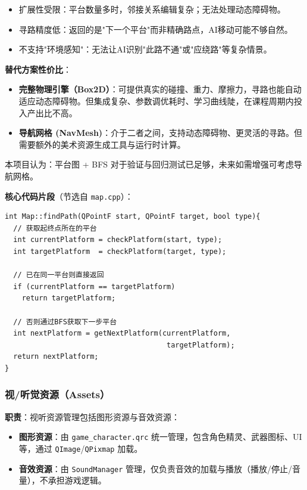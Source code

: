 ﻿\documentclass[utf8]{ctexart}
\begin{document}
\begin{itemize}
  \item 扩展性受限：平台数量多时，邻接关系编辑复杂；无法处理动态障碍物。
  \item 寻路精度低：返回的是"下一个平台"而非精确路点，AI移动可能不够自然。
  \item 不支持"环境感知"：无法让AI识别"此路不通"或"应绕路"等复杂情景。
\end{itemize}

\textbf{替代方案性价比}：

\begin{itemize}
  \item \textbf{完整物理引擎（Box2D）}：可提供真实的碰撞、重力、摩擦力，寻路也能自动适应动态障碍物。但集成复杂、参数调优耗时、学习曲线陡，在课程周期内投入产出比不高。
  \item \textbf{导航网格 (NavMesh)}：介于二者之间，支持动态障碍物、更灵活的寻路。但需要额外的美术资源生成工具与运行时计算。
\end{itemize}

本项目认为：平台图 + BFS 对于验证与回归测试已足够，未来如需增强可考虑导航网格。

\textbf{核心代码片段}（节选自 \texttt{map.cpp}）：

\begin{verbatim}
int Map::findPath(QPointF start, QPointF target, bool type){
  // 获取起终点所在的平台
  int currentPlatform = checkPlatform(start, type);
  int targetPlatform  = checkPlatform(target, type);
  
  // 已在同一平台则直接返回
  if (currentPlatform == targetPlatform) 
    return targetPlatform;
  
  // 否则通过BFS获取下一步平台
  int nextPlatform = getNextPlatform(currentPlatform, 
                                      targetPlatform);
  return nextPlatform;
}
\end{verbatim}

\subsubsection{视/听觉资源（Assets）}

\textbf{职责}：视听资源管理包括图形资源与音效资源：

\begin{itemize}
  \item \textbf{图形资源}：由 \texttt{game\_character.qrc} 统一管理，包含角色精灵、武器图标、UI等，通过 \texttt{QImage}/\texttt{QPixmap} 加载。
  \item \textbf{音效资源}：由 \texttt{SoundManager} 管理，仅负责音效的加载与播放（播放/停止/音量），不承担游戏逻辑。
\end{itemize}
\end{document}
